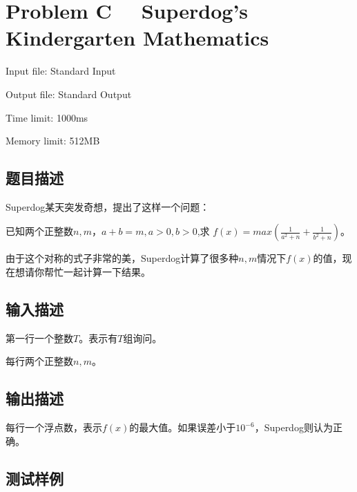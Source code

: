 \newpage
\section{Problem C \ \ Superdog's Kindergarten Mathematics}
{ \limitfont{}
Input file: Standard Input \par
Output file: Standard Output \par
Time limit: 1000ms \par
Memory limit: 512MB \par
}
\subsection*{题目描述}
Superdog某天突发奇想，提出了这样一个问题：

已知两个正整数$n,m$，$a+b=m,a>0,b>0$,求 $f(x)=max(\frac{1}{a^2+n} + \frac{1}{b^2+n})$。

由于这个对称的式子非常的美，Superdog计算了很多种$n,m$情况下$f(x)$的值，现在想请你帮忙一起计算一下结果。

\subsection*{输入描述}

第一行一个整数$T$。表示有$T$组询问。

每行两个正整数$n,m$。

\subsection*{输出描述}

每行一个浮点数，表示$f(x)$的最大值。如果误差小于$10^{-6}$，Superdog则认为正确。

\subsection*{测试样例}

